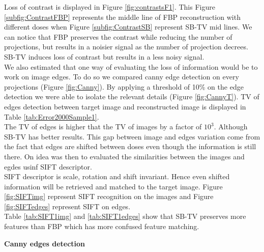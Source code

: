 \documentclass[10pt,a4paper,titlepage]{article}
\begin{document}
		Loss of contrast is displayed in Figure \ref{fig:contrastsF1}. This Figure \ref{subfig:ContrastFBP} represents the middle line of FBP reconstruction with different doses when Figure \ref{subfig:ContrastSB} represent SB-TV mid lines. We can notice that FBP preserves the contrast while reducing the number of projections, but results in a noisier signal as the number of projection decrees. SB-TV induces loss of contrast but results in a less noisy signal.\\
		
		We also estimated that one way of evaluating the loss of information would be to work on image edges. To do so we compared canny edge detection on every projections (Figure \ref{fig:Canny}). By applying a threshold of 10\% on the edge detection we were able to isolate the relevant details (Figure \ref{fig:CannyT}). TV of edges detection between target image and reconstructed image is displayed in Table \ref{tab:Error2000Sample1}. \\
		The TV of edges is higher that the TV of images by a factor of $10^3$. Although SB-TV has better results. This gap between image and edges variation come from the fact that edges are shifted between doses even though the information is still there. On idea was then to evaluated the similarities between the images and egdes usinf SIFT descriptor. \\
		SIFT descriptor is scale, rotation and shift invariant. Hence even shifted information will be retrieved and matched to the target image. Figure \ref{fig:SIFTimg} represent SIFT recognition on the images and Figure \ref{fig:SIFTedges} represent SIFT on edges.\\
		Table \ref{tab:SIFT1img} and \ref{tab:SIFT1edges} show that SB-TV preserves more features than FBP which has more confused feature matching.

\clearpage
		\textbf{Canny edges detection}\\
		
\end{document}
